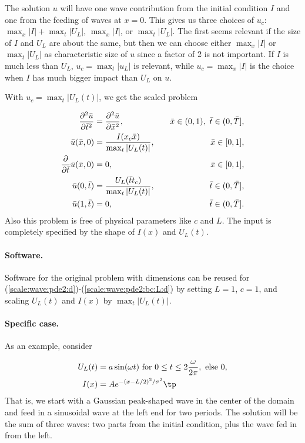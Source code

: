 \documentclass[graybox,envcountchap,sectrefs,final]{svmonodo}
\begin{document}
The solution $u$ will have
one wave contribution from the initial condition $I$ and one from the
feeding of waves at $x=0$. This gives us three choices of $u_c$:
$\max_x |I| + \max_t |U_L|$, $\max_x |I|$, or $\max_t |U_L|$. The first seems
relevant if the size of $I$ and $U_L$ are about the same, but then
we can choose either $\max_x |I|$ or $\max_t |U_L|$ as characteristic size
of $u$ since a factor of 2 is not important. If $I$ is much less than
$U_L$, $u_c=\max_t |u_L|$ is relevant, while $u_c=\max_x|I|$ is the choice
when $I$ has much bigger impact than $U_L$ on $u$.

With $u_c=\max_t |U_L(t)|$, we get the scaled problem

\begin{align}
\frac{\partial^2 \bar u}{\partial \bar t^2} &=
{\partial^2 \bar u\over\partial \bar x^2},
\quad & \bar x\in (0,1),\ \bar t\in (0,\bar T],
\label{scale:wave:pde2:d}\\ 
\bar u(\bar x,0) &= \frac{I(x_c\bar x)}{\max_t |U_L(t)|},
\quad &\bar x\in [0,1],
\label{scale:wave:pde2:ic:u:d}\\ 
{\partial\over\partial \bar t}\bar u(\bar x,0) &= 0,
\quad & \bar x\in [0,1],
\label{scale:wave:pde2:ic:ut:d}\\ 
\bar u(0,\bar t) & = \frac{U_L(\bar tt_c)}{\max_t |U_L(t)|},
\quad  &\bar t\in (0,\bar T],
\label{scale:wave:pde2:bc:0:d}\\ 
\bar u(1,\bar t) & = 0,
\quad &\bar t\in (0,\bar T].
\label{scale:wave:pde2:bc:L:d}
\end{align}
Also this problem is free of physical parameters like $c$ and $L$.
The input is completely specified by the shape of $I(x)$ and $U_L(t)$.

\paragraph{Software.}
Software for the original problem with dimensions can be reused for
(\ref{scale:wave:pde2:d})-(\ref{scale:wave:pde2:bc:L:d}) by
setting $L=1$, $c=1$, and scaling $U_L(t)$ and $I(x)$ by
$\max_t |U_L(t)|$.

\paragraph{Specific case.}
As an example, consider

\begin{align*}
U_L(t) &= a\sin(\omega t)\hbox{ for } 0\leq t\leq 2\frac{\omega}{2\pi},
\hbox{ else } 0,\\ 
I(x)   & = Ae^{-(x-L/2)^2/\sigma^2}\tp
\end{align*}
That is, we start with a Gaussian peak-shaped wave in the center of the
domain and feed in a sinusoidal wave at the left end for two periods.
The solution will be the sum of three waves: two parts from the initial
condition, plus the wave fed in from the left.
\end{document}
